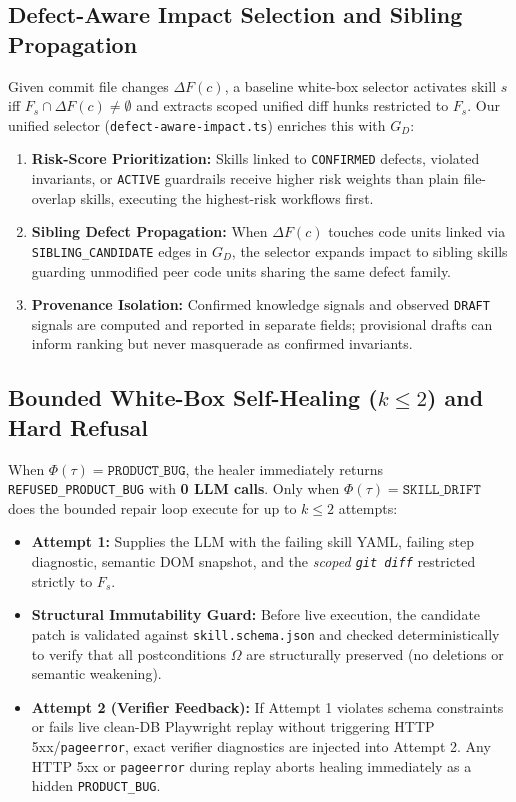 \documentclass[conference]{IEEEtran}
\begin{document}
\subsection{Defect-Aware Impact Selection and Sibling Propagation}
Given commit file changes $\Delta F(c)$, a baseline white-box selector activates skill $s$ iff $F_s \cap \Delta F(c) \neq \emptyset$ and extracts scoped unified diff hunks restricted to $F_s$. Our unified selector (\texttt{defect-aware-impact.ts}) enriches this with $G_D$:
\begin{enumerate}
  \item \textbf{Risk-Score Prioritization:} Skills linked to \texttt{CONFIRMED} defects, violated invariants, or \texttt{ACTIVE} guardrails receive higher risk weights than plain file-overlap skills, executing the highest-risk workflows first.
  \item \textbf{Sibling Defect Propagation:} When $\Delta F(c)$ touches code units linked via \texttt{SIBLING\_CANDIDATE} edges in $G_D$, the selector expands impact to sibling skills guarding unmodified peer code units sharing the same defect family.
  \item \textbf{Provenance Isolation:} Confirmed knowledge signals and observed \texttt{DRAFT} signals are computed and reported in separate fields; provisional drafts can inform ranking but never masquerade as confirmed invariants.
\end{enumerate}

\subsection{Bounded White-Box Self-Healing ($k \le 2$) and Hard Refusal}
When $\Phi(\tau) = \texttt{PRODUCT\_BUG}$, the healer immediately returns \texttt{REFUSED\_PRODUCT\_BUG} with \textbf{0 LLM calls}. Only when $\Phi(\tau) = \texttt{SKILL\_DRIFT}$ does the bounded repair loop execute for up to $k \le 2$ attempts:
\begin{itemize}
  \item \textbf{Attempt 1:} Supplies the LLM with the failing skill YAML, failing step diagnostic, semantic DOM snapshot, and the \emph{scoped \texttt{git diff}} restricted strictly to $F_s$.
  \item \textbf{Structural Immutability Guard:} Before live execution, the candidate patch is validated against \texttt{skill.schema.json} and checked deterministically to verify that all postconditions $\Omega$ are structurally preserved (no deletions or semantic weakening).
  \item \textbf{Attempt 2 (Verifier Feedback):} If Attempt 1 violates schema constraints or fails live clean-DB Playwright replay without triggering HTTP 5xx/\texttt{pageerror}, exact verifier diagnostics are injected into Attempt 2. Any HTTP 5xx or \texttt{pageerror} during replay aborts healing immediately as a hidden \texttt{PRODUCT\_BUG}.
\end{itemize}
\end{document}

